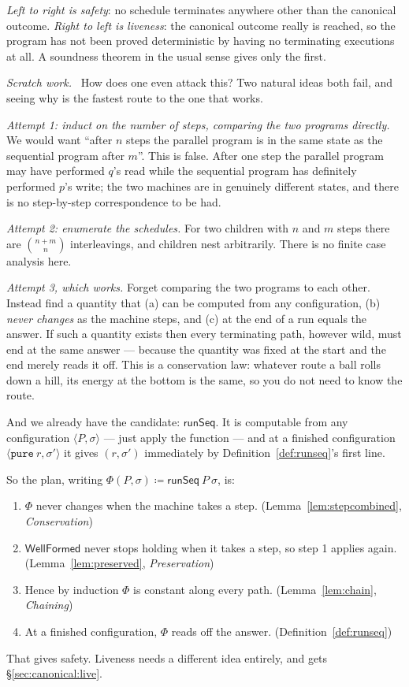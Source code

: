 \documentclass[11pt,a4paper]{article}
\theoremstyle{definition}
\theoremstyle{plain}
\theoremstyle{remark}
\newenvironment{scratch}{\par\medskip\noindent\textit{Scratch work.}\ \ignorespaces}{\par\medskip}
\newcommand{\st}{\sigma}
\newcommand{\runSeq}{\mathsf{runSeq}}
\newcommand{\wf}{\mathsf{WellFormed}}
\begin{document}
\emph{Left to right is safety}: no schedule terminates anywhere other than the canonical
outcome. \emph{Right to left is liveness}: the canonical outcome really is reached, so the
program has not been proved deterministic by having no terminating executions at all. A
soundness theorem in the usual sense gives only the first.

\begin{scratch}
How does one even attack this? Two natural ideas both fail, and seeing why is the fastest
route to the one that works.

\emph{Attempt 1: induct on the number of steps, comparing the two programs directly.} We
would want ``after $n$ steps the parallel program is in the same state as the sequential
program after $m$''. This is false. After one step the parallel program may have performed
$q$'s read while the sequential program has definitely performed $p$'s write; the two
machines are in genuinely different states, and there is no step-by-step correspondence to be
had.

\emph{Attempt 2: enumerate the schedules.} For two children with $n$ and $m$ steps there are
$\binom{n+m}{n}$ interleavings, and children nest arbitrarily. There is no finite case
analysis here.

\emph{Attempt 3, which works.} Forget comparing the two programs to each other. Instead find
a quantity that (a) can be computed from any configuration, (b) \emph{never changes} as the
machine steps, and (c) at the end of a run equals the answer. If such a quantity exists then
every terminating path, however wild, must end at the same answer --- because the quantity
was fixed at the start and the end merely reads it off. This is a conservation law: whatever
route a ball rolls down a hill, its energy at the bottom is the same, so you do not need to
know the route.

And we already have the candidate: $\runSeq$. It is computable from any configuration
$\langle P, \st\rangle$ --- just apply the function --- and at a finished configuration
$\langle \texttt{pure}\ r, \st'\rangle$ it gives $(r,\st')$ immediately by
Definition~\ref{def:runseq}'s first line.
\end{scratch}

So the plan, writing $\Phi(P,\st) \coloneqq \runSeq\ P\ \st$, is:
\begin{enumerate}[label=\arabic*.,leftmargin=2em,itemsep=1pt]
\item $\Phi$ never changes when the machine takes a step. \hfill (Lemma~\ref{lem:stepcombined}, \emph{Conservation})
\item $\wf$ never stops holding when it takes a step, so step 1 applies again. \hfill (Lemma~\ref{lem:preserved}, \emph{Preservation})
\item Hence by induction $\Phi$ is constant along every path. \hfill (Lemma~\ref{lem:chain}, \emph{Chaining})
\item At a finished configuration, $\Phi$ reads off the answer. \hfill (Definition~\ref{def:runseq})
\end{enumerate}
That gives safety. Liveness needs a different idea entirely, and gets \S\ref{sec:canonical:live}.
\end{document}
